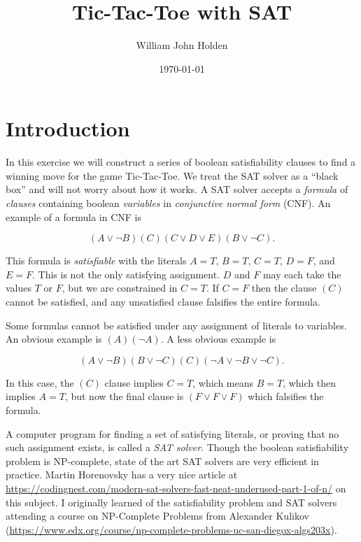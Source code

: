\documentclass[12pt]{article}
\title{Tic-Tac-Toe with SAT}
\author{William John Holden}
\date{\today}
\begin{document}
\maketitle

\section{Introduction}

In this exercise we will construct a series of boolean satisfiability clauses to find a winning move for the game Tic-Tac-Toe.
We treat the SAT solver as a ``black box'' and will not worry about how it works.
A SAT solver accepts a \textit{formula} of \textit{clauses} containing boolean \textit{variables} in \textit{conjunctive normal form} (CNF).
An example of a formula in CNF is

\begin{equation}(A \vee \neg B)(C)(C \vee D \vee E)(B \vee \neg C).\end{equation}

This formula is \textit{satisfiable} with the literals $A=T$, $B=T$, $C=T$, $D=F$, and $E=F$.
This is not the only satisfying assignment.
$D$ and $F$ may each take the values $T$ or $F$, but we are constrained in $C=T$.
If $C=F$ then the clause $(C)$ cannot be satisfied, and any unsatisfied clause falsifies the entire formula.

Some formulas cannot be satisfied under any assignment of literals to variables. An obvious example is $(A)(\neg A)$.
A less obvious example is

\begin{equation}(A \vee \neg B)(B \vee \neg C)(C)(\neg A \vee \neg B \vee \neg C).\end{equation}

In this case, the $(C)$ clause implies $C=T$, which means $B=T$, which then implies $A=T$, but now the final clause is $(F \vee F \vee F)$ which falsifies the formula.

A computer program for finding a set of satisfying literals, or proving that no such assignment exists, is called a \textit{SAT solver}.
Though the boolean satisfiability problem is NP-complete, state of the art SAT solvers are very efficient in practice.
Martin Horenovsky has a very nice article at \url{https://codingnest.com/modern-sat-solvers-fast-neat-underused-part-1-of-n/} on this subject.
I originally learned of the satisfiability problem and SAT solvers attending a course on NP-Complete Problems from Alexander Kulikov (\url{https://www.edx.org/course/np-complete-problems-uc-san-diegox-algs203x}).
\end{document}

